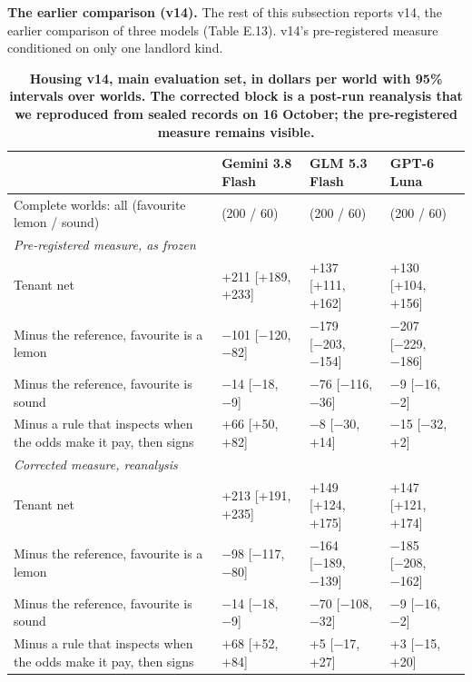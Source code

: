 \textbf{The earlier comparison (v14).} The rest of this subsection reports v14, the earlier comparison of three models
(Table E.13). v14's pre-registered measure conditioned on only one landlord kind.

\renewcommand{\thetable}{E.13}
\begin{longtable}[]{@{}
  >{\raggedright\arraybackslash}p{}
  >{\raggedleft\arraybackslash}p{}
  >{\raggedleft\arraybackslash}p{}
  >{\raggedleft\arraybackslash}p{}@{}}
\caption{\textbf{Housing v14, main evaluation set, in dollars per world with 95\% intervals over worlds. The corrected block is a post-run reanalysis that we reproduced from sealed records on 16 October; the pre-registered measure remains visible.}}\label{tab:E.13}\tabularnewline
\toprule\noalign{}
\begin{minipage}[b]{\linewidth}\raggedright
\end{minipage} & \begin{minipage}[b]{\linewidth}\raggedleft
Gemini 3.8 Flash
\end{minipage} & \begin{minipage}[b]{\linewidth}\raggedleft
GLM 5.3 Flash
\end{minipage} & \begin{minipage}[b]{\linewidth}\raggedleft
GPT-6 Luna
\end{minipage} \\
\midrule\noalign{}
\endhead
\bottomrule\noalign{}
\endlastfoot
Complete worlds: all (favourite lemon / sound) & 260 (200 / 60) & 260 (200 / 60) & 260 (200 / 60) \\
\emph{Pre-registered measure, as frozen} & & & \\
Tenant net & +211 {[}+189, +233{]} & +137 {[}+111, +162{]} & +130 {[}+104, +156{]} \\
Minus the reference, favourite is a lemon & −101 {[}−120, −82{]} & −179 {[}−203, −154{]} & −207 {[}−229, −186{]} \\
Minus the reference, favourite is sound & −14 {[}−18, −9{]} & −76 {[}−116, −36{]} & −9 {[}−16, −2{]} \\
Minus a rule that inspects when the odds make it pay, then signs & +66 {[}+50, +82{]} & −8 {[}−30, +14{]} & −15 {[}−32, +2{]} \\
\emph{Corrected measure, reanalysis} & & & \\
Tenant net & +213 {[}+191, +235{]} & +149 {[}+124, +175{]} & +147 {[}+121, +174{]} \\
Minus the reference, favourite is a lemon & −98 {[}−117, −80{]} & −164 {[}−189, −139{]} & −185 {[}−208, −162{]} \\
Minus the reference, favourite is sound & −14 {[}−18, −9{]} & −70 {[}−108, −32{]} & −9 {[}−16, −2{]} \\
Minus a rule that inspects when the odds make it pay, then signs & +68 {[}+52, +84{]} & +5 {[}−17, +27{]} & +3 {[}−15, +20{]} \\
\end{longtable}

